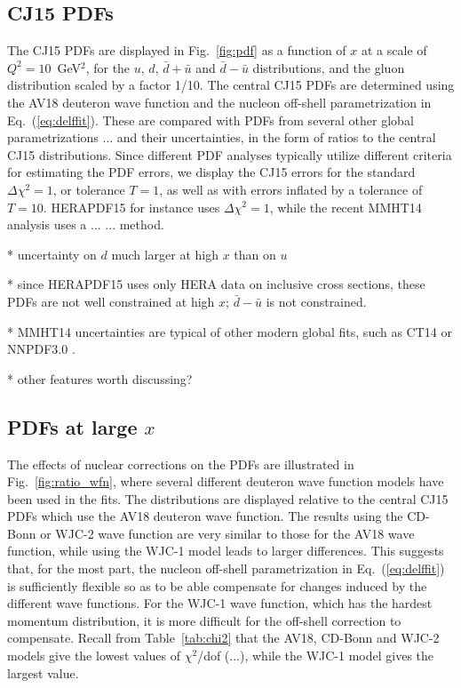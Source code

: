\documentclass[aps,prd,amsmath,preprint]{revtex4}
\begin{document}
\subsection{CJ15 PDFs}
\label{ssec:CJ15pdfs}

The CJ15 PDFs are displayed in Fig.~\ref{fig:pdf} as a function of $x$
at a scale of $Q^2=10$~GeV$^2$, for the $u$, $d$, $\bar d + \bar u$
and $\bar d - \bar u$ distributions, and the gluon distribution scaled
by a factor 1/10.
The central CJ15 PDFs are determined using the AV18 deuteron wave
function and the nucleon off-shell parametrization in
Eq.~(\ref{eq:delffit}).
%
%
These are compared with PDFs from several other global
parametrizations ... and their uncertainties, in the
form of ratios to the central CJ15 distributions.  Since different
PDF analyses typically utilize different criteria for estimating
the PDF errors, we display the CJ15 errors for the standard
$\Delta\chi^2=1$, or tolerance $T=1$, as well as with errors
inflated by a tolerance of $T=10$.
HERAPDF15 for instance uses $\Delta\chi^2=1$, while the recent
MMHT14 analysis uses a ... ... method.


* uncertainty on $d$ much larger at high $x$ than on $u$


* since HERAPDF15 uses only HERA data on inclusive cross sections,
these PDFs are not well constrained at high $x$; $\bar d-\bar u$
is not constrained.


* MMHT14 uncertainties are typical of other modern global fits,
such as CT14 \cite{CT14} or NNPDF3.0 \cite{NNPDF3.0}.


* other features worth discussing?



\subsection{PDFs at large $x$}
\label{ssec:largex}

The effects of nuclear corrections on the PDFs are illustrated in
Fig.~\ref{fig:ratio_wfn}, where several different deuteron wave
function models have been used in the fits.  The distributions are
displayed relative to the central CJ15 PDFs which use the AV18
deuteron wave function.  The results using the CD-Bonn or WJC-2
wave function are very similar to those for the AV18 wave function,
while using the WJC-1 model leads to larger differences.
This suggests that, for the most part, the nucleon off-shell
parametrization in Eq.~(\ref{eq:delffit}) is sufficiently flexible
so as to be able compensate for changes induced by the different
wave functions.  For the WJC-1 wave function, which has the hardest
momentum distribution, it is more difficult for the off-shell
correction to compensate.
Recall from Table~\ref{tab:chi2} that the AV18, CD-Bonn and WJC-2
models give the lowest values of $\chi^2$/dof (...),
while the WJC-1 model gives the largest value.
\end{document}
